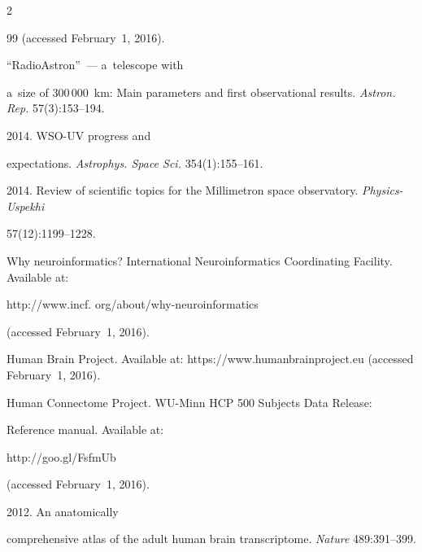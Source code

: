 \begin{multicols}{2}
{{\begin{thebibliography}{99}
(accessed February~1, 2016).






``RadioAstron''~--- a~telescope with 


a~size of 300\,000~km: Main parameters and first observational results. \textit{Astron. Rep.} 57(3):153--194.




 2014. WSO-UV progress and 


expectations. \textit{Astrophys. Space Sci.} 354(1):155--161.




 2014. Review of scientific topics for the Millimetron space observatory. \textit{Physics-Uspekhi} 


57(12):1199--1228.




Why neuroinformatics? International Neuroinformatics Coordinating Facility. Available at: {\sf 


http://www.incf. org/about/why-neuroinformatics} (accessed February~1, 2016).




Human Brain Project. Available at: {\sf https://www.\linebreak humanbrainproject.eu} (accessed February~1, 2016).




Human Connectome Project. WU-Minn HCP 500 Subjects Data Release: 


Reference manual. Available at: {\sf 


http://goo.gl/FsfmUb} (accessed February~1, 2016).




 2012. An anatomically 


comprehensive atlas of the adult human brain transcriptome. \textit{Nature} 489:391--399.




\end{thebibliography}}}
\end{multicols}

